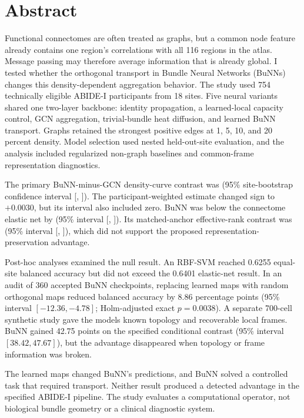 \documentclass[11pt,a4paper]{article}
\begin{document}
\section*{Abstract}

Functional connectomes are often treated as graphs, but a common node feature
already contains one region's correlations with all 116 regions in the atlas.
Message passing may therefore average information that is already global. I
tested whether the orthogonal transport in Bundle Neural Networks (BuNNs)
changes this density-dependent aggregation behavior. The study used 754
technically eligible ABIDE-I participants from 18 sites. Five neural variants
shared one two-layer backbone: identity propagation, a learned-local capacity
control, GCN aggregation, trivial-bundle heat diffusion, and learned BuNN
transport. Graphs retained the strongest positive edges at 1, 5, 10, and 20
percent density. Model selection used nested held-out-site evaluation, and the
analysis included regularized non-graph baselines and common-frame
representation diagnostics.

The primary BuNN-minus-GCN density-curve contrast was \BunnGcnEstimate{} (95\%
site-bootstrap confidence interval [\BunnGcnCILow{}, \BunnGcnCIHigh{}]). The
participant-weighted estimate changed sign to $+0.0030$, but its interval also
included zero. BuNN was below the connectome elastic net by
\BunnElasticEstimate{} (95\% interval [\BunnElasticCILow{},
\BunnElasticCIHigh{}]). Its matched-anchor effective-rank contrast was
\RankEstimate{} (95\% interval [\RankCILow{}, \RankCIHigh{}]), which did not
support the proposed representation-preservation advantage.

Post-hoc analyses examined the null result. An RBF-SVM reached 0.6255
equal-site balanced accuracy but did not exceed the 0.6401 elastic-net result.
In an audit of 360 accepted BuNN checkpoints, replacing learned maps with random
orthogonal maps reduced balanced accuracy by 8.86 percentage points (95\%
interval $[-12.36,-4.78]$; Holm-adjusted exact $p=0.0038$). A separate
700-cell synthetic study gave the models known topology and recoverable local
frames. BuNN gained 42.75 points on the specified conditional contrast (95\%
interval $[38.42,47.67]$), but the advantage disappeared when topology or
frame information was broken.

The learned maps changed BuNN's predictions, and BuNN solved a controlled task
that required transport. Neither result produced a detected advantage in the
specified ABIDE-I pipeline. The study evaluates a computational operator, not
biological bundle geometry or a clinical diagnostic system.
\end{document}
